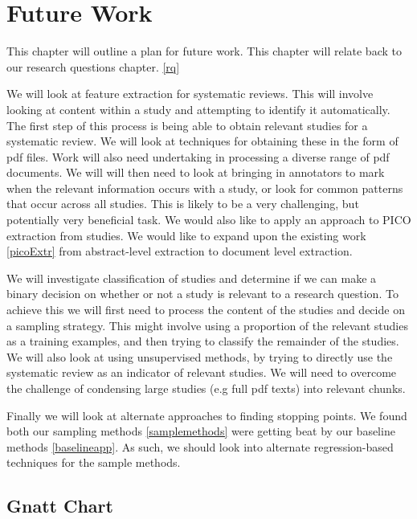 \chapter{Future Work} \label{fw}

This chapter will outline a plan for future work. This chapter will relate back to our research questions chapter. \ref{rq}

We will look at feature extraction for systematic reviews. This will involve looking at content within a study and attempting to identify it automatically. The first step of this process is being able to obtain relevant studies for a systematic review. We will look at techniques for obtaining these in the form of pdf files. Work will also need undertaking in processing a diverse range of pdf documents. We will will then need to look at bringing in annotators to mark when the relevant information occurs with a study, or look for common patterns that occur across all studies. This is likely to be a very challenging, but potentially very beneficial task. We would also like to apply an approach to PICO extraction from studies. We would like to expand upon the existing work \ref{picoExtr} from abstract-level extraction to document level extraction.


We will investigate classification of studies and determine if we can make a binary decision on whether or not a study is relevant to a research question. To achieve this we will first need to process the content of the studies and decide on a sampling strategy. This might involve using a proportion of the relevant studies as a training examples, and then trying to classify the remainder of the studies. We will also look at using unsupervised methods, by trying to directly use the systematic review as an indicator of relevant studies. We will need to overcome the challenge of condensing large studies (e.g full pdf texts) into relevant chunks.


Finally we will look at alternate approaches to finding stopping points. We found both our sampling methods \ref{samplemethods} were getting beat by our baseline methods \ref{baselineapp}. As such, we should look into alternate regression-based techniques for the sample methods.


\section{Gnatt Chart}


